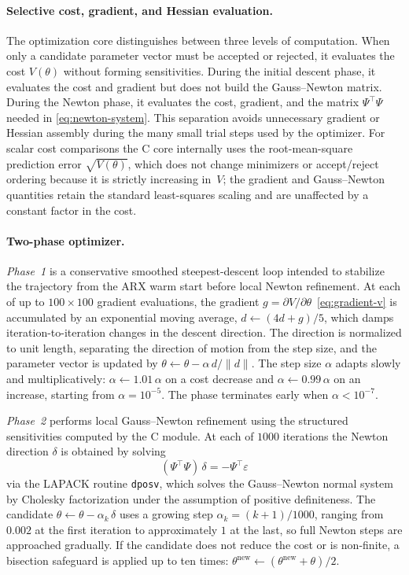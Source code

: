 \documentclass{ifacconf}
\begin{document}
\paragraph*{Selective cost, gradient, and Hessian evaluation.}
The optimization core distinguishes between three levels of computation.
When only a candidate parameter vector must be accepted or rejected, it
evaluates the cost $V(\theta)$ without forming sensitivities.  During the
initial descent phase, it evaluates the cost and gradient but does not build
the Gauss--Newton matrix.  During the Newton phase, it evaluates the cost,
gradient, and the matrix $\Psi^\top\Psi$ needed in
\eqref{eq:newton-system}.  This separation avoids unnecessary gradient or
Hessian assembly during the many small trial steps used by the optimizer.
For scalar cost comparisons the C core internally uses the
root-mean-square prediction error $\sqrt{V(\theta)}$, which
does not change minimizers or accept/reject ordering because it is
strictly increasing in~$V$; the gradient and Gauss--Newton quantities
retain the standard least-squares scaling and are unaffected by a
constant factor in the cost.

\paragraph*{Two-phase optimizer.}
\emph{Phase~1} is a conservative smoothed steepest-descent loop intended to
stabilize the trajectory from the ARX warm start before local Newton
refinement.  At each of up to $100 \times 100$ gradient evaluations, the
gradient $g = \partial V/\partial\theta$~\eqref{eq:gradient-v} is accumulated
by an exponential moving average, $d \leftarrow (4d + g)/5$, which damps
iteration-to-iteration changes in the descent direction.  The direction is
normalized to unit length, separating the direction of motion from the step
size, and the parameter vector is updated by
$\theta \leftarrow \theta - \alpha\,d/\|d\|$.  The step size $\alpha$ adapts
slowly and multiplicatively: $\alpha \leftarrow 1.01\,\alpha$ on a cost
decrease and $\alpha \leftarrow 0.99\,\alpha$ on an increase, starting from
$\alpha = 10^{-5}$.  The phase terminates early when $\alpha < 10^{-7}$.

\emph{Phase~2} performs local Gauss--Newton refinement using the structured
sensitivities computed by the C module.  At each of $1000$ iterations the
Newton direction $\delta$ is obtained by solving
\begin{equation}
  (\Psi^\top\Psi)\,\delta = -\Psi^\top\varepsilon
  \label{eq:newton-system}
\end{equation}
via the LAPACK routine \texttt{dposv}, which solves the Gauss--Newton
normal system by Cholesky factorization under the assumption of positive
definiteness.  The candidate
$\theta \leftarrow \theta - \alpha_k\,\delta$ uses a growing step
$\alpha_k = (k+1)/1000$, ranging from $0.002$ at the first iteration to
approximately $1$ at the last, so full Newton steps are approached gradually.
If the candidate does not reduce the cost or is non-finite, a bisection
safeguard is applied up to ten times:
$\theta^{\mathrm{new}} \leftarrow (\theta^{\mathrm{new}} + \theta)/2$.
\end{document}
